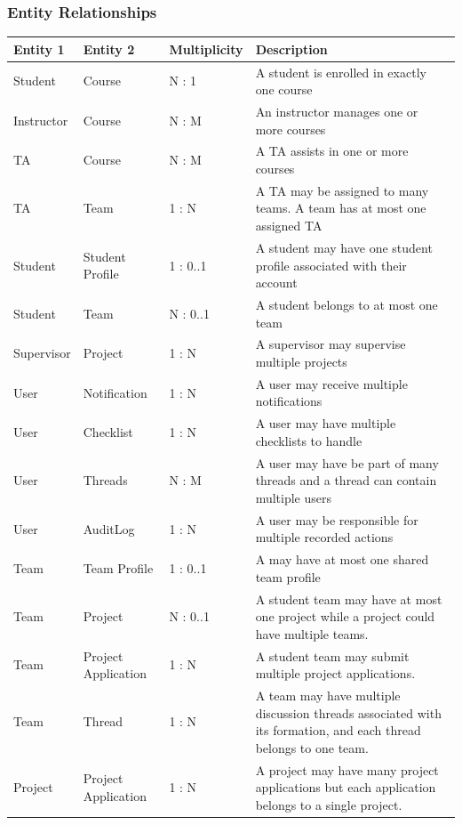 \documentclass[12pt]{article}
\begin{document}
  \subsubsection{Entity Relationships}
  \begin{longtable}{|p{2cm}|p{2cm}|p{2.5cm}|p{8cm}|}
    \toprule
    \textbf{Entity 1} & \textbf{Entity 2} & \textbf{Multiplicity} & \textbf{Description}\\
    \midrule
    Student & Course & N : 1 & A student is enrolled in exactly one course \\ \hline
    Instructor & Course & N : M & An instructor manages one or more courses \\ \hline
    TA & Course & N : M & A TA assists in one or more courses \\ \hline
    TA & Team & 1 : N & A TA may be assigned to many teams. A team has at most one assigned TA \\ \hline
    Student & Student Profile & 1 : 0..1 & A student may have one student profile associated with their account\\ \hline
    Student & Team & N : 0..1 & A student belongs to at most one team\\ \hline
    Supervisor & Project & 1 : N & A supervisor may supervise multiple projects\\ \hline
    User & Notification & 1 : N & A user may receive multiple notifications\\ \hline
    User & Checklist & 1 : N & A user may have multiple checklists to handle\\ \hline
    User & Threads & N : M & A user may have be part of many threads and a thread can contain multiple users\\ \hline
    User & AuditLog & 1 : N & A user may be responsible for multiple recorded actions\\ \hline
    Team & Team Profile & 1 : 0..1 & A may have at most one shared team profile\\ \hline
    Team & Project & N : 0..1 & A student team may have at most one project while a project could have multiple teams.\\ \hline
    Team & Project Application & 1 : N & A student team may submit multiple project applications.\\ \hline
    Team & Thread & 1 : N & A team may have multiple discussion threads associated with its formation, and each thread belongs to one team. \\ \hline
    Project & Project Application & 1 : N & A project may have many project applications but each application belongs to a single project.\\ \hline

\end{longtable}
\end{document}
